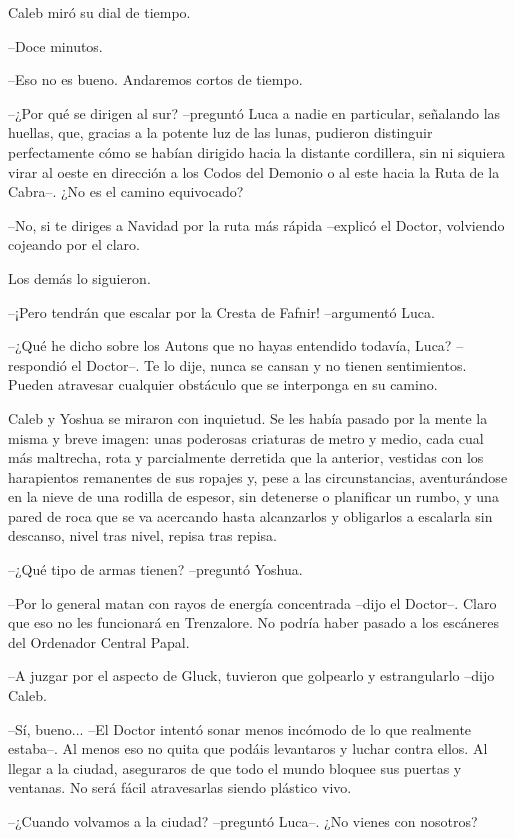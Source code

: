 Caleb miró su dial de tiempo.
 
--Doce minutos.
 
--Eso no es bueno. Andaremos cortos de tiempo.
 
--¿Por qué se dirigen al sur? --preguntó Luca a nadie en particular, señalando las huellas, que, gracias a la potente luz de las lunas, pudieron distinguir perfectamente cómo se habían dirigido hacia la distante cordillera, sin ni siquiera virar al oeste en dirección a los Codos del Demonio o al este hacia la Ruta de la Cabra--. ¿No es el camino equivocado?
 
--No, si te diriges a Navidad por la ruta más rápida --explicó el Doctor, volviendo cojeando por el claro.
 
Los demás lo siguieron.
 
--¡Pero tendrán que escalar por la Cresta de Fafnir! --argumentó Luca.
 
--¿Qué he dicho sobre los Autons que no hayas entendido todavía, Luca? --respondió el Doctor--. Te lo dije, nunca se cansan y no tienen sentimientos. Pueden atravesar cualquier obstáculo que se interponga en su camino.
 
Caleb y Yoshua se miraron con inquietud. Se les había pasado por la mente la misma y breve imagen: unas poderosas criaturas de metro y medio, cada cual más maltrecha, rota y parcialmente derretida que la anterior, vestidas con los harapientos remanentes de sus ropajes y, pese a las circunstancias, aventurándose en la nieve de una rodilla de espesor, sin detenerse o planificar un rumbo, y una pared de roca que se va acercando hasta alcanzarlos y obligarlos a escalarla sin descanso, nivel tras nivel, repisa tras repisa.
 
--¿Qué tipo de armas tienen? --preguntó Yoshua.
 
--Por lo general matan con rayos de energía concentrada --dijo el Doctor--. Claro que eso no les funcionará en Trenzalore. No podría haber pasado a los escáneres del Ordenador Central Papal.
 
--A juzgar por el aspecto de Gluck, tuvieron que golpearlo y estrangularlo --dijo Caleb.
 
--Sí, bueno... --El Doctor intentó sonar menos incómodo de lo que realmente estaba--. Al menos eso no quita que podáis levantaros y luchar contra ellos. Al llegar a la ciudad, aseguraros de que todo el mundo bloquee sus puertas y ventanas. No será fácil atravesarlas siendo plástico vivo.
 
--¿Cuando volvamos a la ciudad? --preguntó Luca--. ¿No vienes con nosotros?
 
